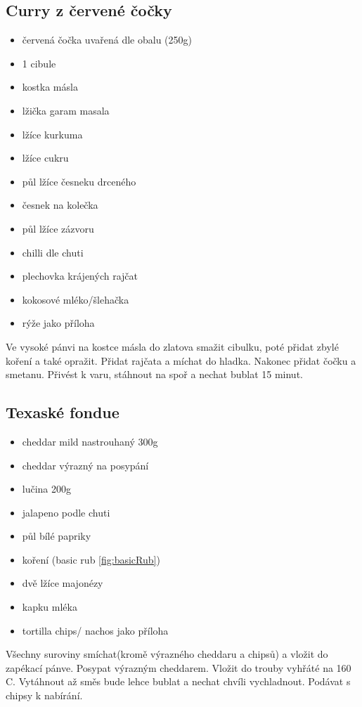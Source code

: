 \documentclass[10pt,a4paper]{article}
\newenvironment{myitemize}
{ \begin{itemize}
    \setlength{\itemsep}{0pt}
    \setlength{\parskip}{0pt}
    \setlength{\parsep}{0pt}     }
{ \end{itemize}                  }
\begin{document}
\subsection{Curry z červené čočky}
\begin{minipage}[t]{0,5\textwidth}
\begin{myitemize} 
\item červená čočka uvařená dle obalu (250g)
\item 1 cibule
\item kostka másla
\item lžička garam masala
\item lžíce kurkuma
\item lžíce cukru
\item půl lžíce česneku drceného
\item česnek na kolečka
\item půl lžíce zázvoru
\item chilli dle chuti
\item plechovka krájených rajčat
\item kokosové mléko/šlehačka
\item rýže jako příloha
\end{myitemize}
\end{minipage}
\begin{minipage}[t]{0,5\textwidth}
Ve vysoké pánvi na kostce másla do zlatova smažit cibulku, poté přidat zbylé koření a také opražit. Přidat rajčata a míchat do hladka. Nakonec přidat čočku a smetanu. Přivést k varu, stáhnout na spoř a nechat bublat 15 minut.
\end{minipage}

\subsection{Texaské fondue}
\begin{minipage}[t]{0,5\textwidth}
\begin{myitemize} 
\item cheddar mild nastrouhaný 300g
\item cheddar výrazný na posypání
\item lučina 200g 
\item jalapeno podle chuti
\item půl bílé papriky
\item koření (basic rub \ref{fig:basicRub})
\item dvě lžíce majonézy
\item kapku mléka
\item tortilla chips/ nachos jako příloha
\end{myitemize}
\end{minipage}
\begin{minipage}[t]{0,5\textwidth}
Všechny suroviny smíchat(kromě výrazného cheddaru a chipsů) a vložit do zapékací pánve. Posypat výrazným cheddarem. Vložit do trouby vyhřáté na 160 \degree C. Vytáhnout až směs bude lehce bublat a nechat chvíli vychladnout. Podávat s chipsy k nabírání.
\end{minipage}
\pagebreak
\end{document}
